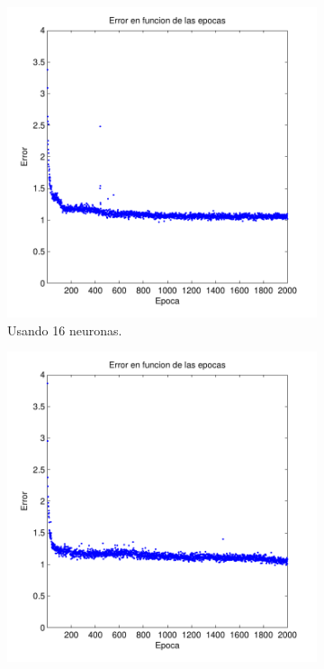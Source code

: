 \documentclass[informe.tex]{subfiles}
\begin{document}
    
    \begin{figure}[H]
        \centering
        \begin{subfigure}[b]{0.32\textwidth}
                \includegraphics[width=\textwidth]{graficos/error_fold2_16_binary-regresion_2000_01.pdf}
                \caption{Usando 16 neuronas.}
                \label{fig:d2-f2-2k-01-n16}
        \end{subfigure}
        \begin{subfigure}[b]{0.32\textwidth}
                \includegraphics[width=\textwidth]{graficos/error_fold2_17_binary-regresion_2000_01.pdf}

\end{subfigure}
\end{figure}
\end{document}
